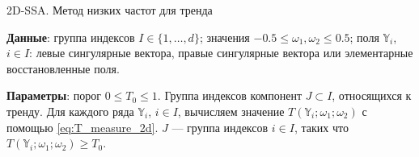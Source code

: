 \documentclass[specialist,
               substylefile = spbu.rtx,
               subf,href,colorlinks=true, 12pt]{disser}
\begin{document}
 \begin{algorithm}[!hhh]
\caption{2D-SSA. Метод низких частот для тренда}
\label{alg:freq2d}
\begin{algorithmic}[1]
\REQUIRE 

\item \textbf{Данные}: группа индексов $I \in \{1,\ldots,d\}$; значения  $-0.5 \leqslant  \omega_1, \omega_2 \leqslant 0.5$; поля $\mathbb{Y}_i$, $i \in I$: левые сингулярные вектора,
правые сингулярные вектора или элементарные восстановленные поля.
\item \textbf{Параметры}: порог $0 \leqslant T_0 \leqslant 1$.
\ENSURE Группа индексов компонент $J \subset I$, относящихся к тренду.
\STATE  Для каждого ряда $\mathbb{Y}_i$, $i \in I$, вычисляем значение $T(\mathbb{Y}_i; \omega_{1}; \omega_{2})$ с помощью \eqref{eq:T_measure_2d}.
\STATE $J$ --- группа индексов $i \in I$, таких что $T(\mathbb{Y}_i; \omega_{1}; \omega_{2}) \geqslant T_0$.
\end{algorithmic}
\end{algorithm}

%
%
\end{document}
